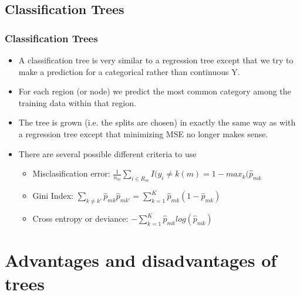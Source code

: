 \documentclass[
  shownotes,
  xcolor={svgnames},
  hyperref={colorlinks,citecolor=DarkBlue,linkcolor=DarkRed,urlcolor=DarkBlue}
  ]{beamer}
\begin{document}
\subsection{Classification Trees}
\begin{frame}[fragile]
\frametitle{Classification Trees}

\begin{itemize}
\item A classification tree is very similar to a regression tree except that we try to make a prediction for a categorical rather than continuous Y.
\item For each region (or node) we predict the most common category among the training data within that region.
\item The tree is grown (i.e. the splits are chosen) in exactly the same way as with a regression tree except that minimizing MSE no longer makes sense.
\item There are several possible different criteria to use %
\begin{itemize}
  \item Misclasification error: $\frac{1}{n_m}\sum_{i\in R_m} I(y_i \neq k(m)=1-max_k (\hat{p}_{mk}$
  \item Gini Index: $\sum_{k\neq k'}\hat{p}_{mk}\hat{p}_{mk'}=\sum_{k=1}^K \hat{p}_{mk}(1-\hat{p}_{mk})$
  \item Cross entropy or deviance: $- \sum_{k=1}^K \hat{p}_{mk}log(\hat{p}_{mk})$
\end{itemize}
\end{itemize}


\end{frame}
\section{Advantages and disadvantages of trees}
\end{document}
